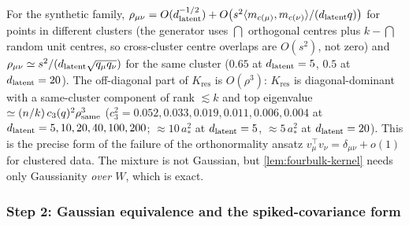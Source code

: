 For the synthetic family, $\rho_{\mu\nu}=O(d_{\mathrm{latent}}^{-1/2})+O\bigl(s^2\langle m_{c(\mu)},m_{c(\nu)}\rangle/(d_{\mathrm{latent}} q)\bigr)$ for points in different clusters (the generator uses $\dint$ orthogonal centres plus $k-\dint$ random unit centres, so cross-cluster centre overlaps are $O(s^2)$, not zero) and $\rho_{\mu\nu}\simeq s^2/(d_{\mathrm{latent}}\sqrt{q_\mu q_\nu})$ for the same cluster ($0.65$ at $d_{\mathrm{latent}}=5$, $0.5$ at $d_{\mathrm{latent}}=20$). The off-diagonal part of $K_{\mathrm{res}}$ is $O(\rho^3)$: $K_{\mathrm{res}}$ is diagonal-dominant with a same-cluster component of rank $\lesssim k$ and top eigenvalue $\simeq(n/k)\,c_3(q)^2\rho_{\mathrm{same}}^3$ ($c_3^2=0.052,0.033,0.019,0.011,0.006,0.004$ at $d_{\mathrm{latent}}=5,10,20,40,100,200$; $\approx10\,a_*^2$ at $d_{\mathrm{latent}}=5$, $\approx5\,a_*^2$ at $d_{\mathrm{latent}}=20$). This is the precise form of the failure of the orthonormality ansatz $v_\mu^\top v_\nu=\delta_{\mu\nu}+o(1)$ for clustered data. The mixture is not Gaussian, but \cref{lem:fourbulk-kernel} needs only Gaussianity \emph{over $W$}, which is exact.

\subsubsection{Step 2: Gaussian equivalence and the spiked-covariance form}

